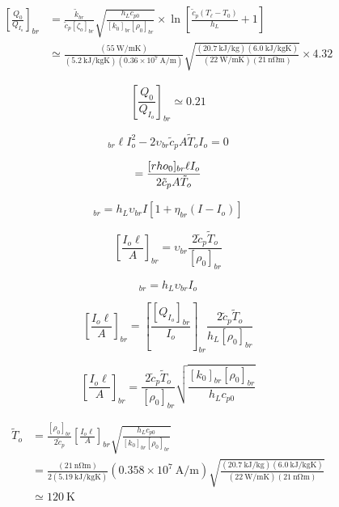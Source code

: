 \begin{align*}
\left[\frac{Q_0}{Q_{I_o}}\right]_{br}&=\frac{\tilde{k}_{br}}{\tilde{c}_p[\zeta_o]_{br}}\sqrt{\frac{h_Lc_{p0}}{[k_0]_{br}[\rho_0]_{br}}}\times\ln\left[\frac{\tilde{c}_p(T_\ell-T_0)}{h_L}+1\right] \\
&\simeq\frac{(55\ \mathrm{W/mK})}{(5.2\ \mathrm{kJ/kgK})(0.36\times 10^7\ \mathrm{A/m})}\sqrt{\frac{(20.7\ \mathrm{kJ/kg})(6.0\ \mathrm{kJ/kgK})}{(22\ \mathrm{W/mK})(21\ \mathrm{n\Omega m})}}\times 4.32
\end{align*}

\begin{equation}%
\left[\frac{Q_0}{Q_{I_o}}\right]_{br}\simeq0.21
\end{equation}

\begin{equation}
[\rho_0]_{br}\ell I_{o}^{2}-2\upsilon_{br}\tilde{c}_pA\tilde{T}_oI_o=0
\end{equation}

\begin{equation}%
\unboldmath=\frac{[rho_0]_{br}\ell I_o}{2\tilde{c}_pA\tilde{T}_o}
\end{equation}

\begin{equation}%
[Q_{I_o}]_{br}=h_L\upsilon_{br}I[1+\eta_{br}(I-I_o)]
\end{equation}

\begin{equation}
\left[\frac{I_o\ell}{A}\right]_{br}=\upsilon_{br}\frac{2\tilde{c}_p\tilde{T}_o}{[\rho_0]_{br}}
\end{equation}

\begin{equation}
[Q_{I_o}]_{br}=h_L\upsilon_{br}I_o
\end{equation}

\begin{equation}
\left[\frac{I_o\ell}{A}\right]_{br}=\left[\frac{[Q_{I_o}]_{br}}{I_o}\right]_{br}\frac{2\tilde{c}_p\tilde{T}_o}{h_L[\rho_0]_{br}}
\end{equation}

\begin{equation}%
\left[\frac{I_o\ell}{A}\right]_{br}=\frac{2\tilde{c}_p\tilde{T}_o}{[\rho_0]_{br}}\sqrt{\frac{[k_0]_{br}[\rho_0]_{br}}{h_Lc_{p0}}}
\end{equation}

\begin{align*}
\tilde{T}_o&=\frac{[\rho_0]_{br}}{2\tilde{c}_p}\left[\frac{I_o\ell}{A}\right]_{br}\sqrt{\frac{h_Lc_{p0}}{[k_0]_{br}[\rho_0]_{br}}} \\
&=\frac{(21\ \mathrm{n\Omega m})}{2(5.19\ \mathrm{kJ/kgK})}(0.358\times 10^7\ \mathrm{A/m})\sqrt{\frac{(20.7\ \mathrm{kJ/kg})(6.0\ \mathrm{kJ/kgK})}{(22\ \mathrm{W/mK})(21\ \mathrm{n\Omega m})}}\\
&\simeq 120\ \mathrm{K}
\end{align*}

